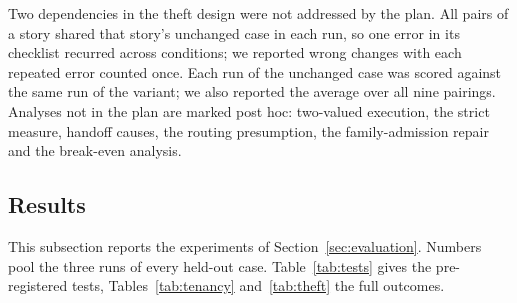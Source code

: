 Two dependencies in the theft design were not addressed by the plan. All pairs of a story shared that story's unchanged case in each run, so one error in its checklist recurred across conditions; we reported wrong changes with each repeated error counted once. Each run of the unchanged case was scored against the same run of the variant; we also reported the average over all nine pairings. Analyses not in the plan are marked post hoc: two-valued execution, the strict measure, handoff causes, the routing presumption, the family-admission repair and the break-even analysis.

\subsection{Results}
\label{sec:results}

This subsection reports the experiments of Section~\ref{sec:evaluation}. Numbers pool the three runs of every held-out case. Table~\ref{tab:tests} gives the pre-registered tests, Tables~\ref{tab:tenancy} and~\ref{tab:theft} the full outcomes.

